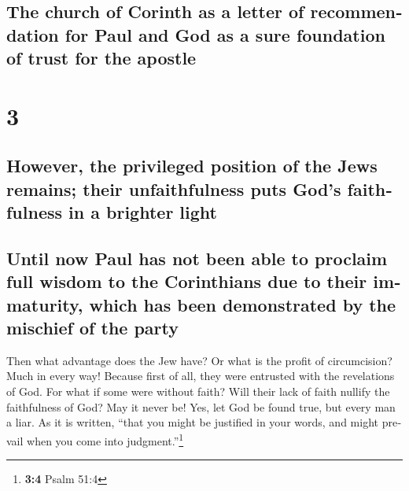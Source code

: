 \begin{paracol}{2}
\begin{otherlanguage}{english}
\hypertarget{the-church-of-corinth-as-a-letter-of-recommendation-for-paul-and-god-as-a-sure-foundation-of-trust-for-the-apostle}{%
\subsection{The church of Corinth as a letter of recommendation for Paul
and God as a sure foundation of trust for the
apostle}\label{the-church-of-corinth-as-a-letter-of-recommendation-for-paul-and-god-as-a-sure-foundation-of-trust-for-the-apostle}}

\hypertarget{section-5}{%
\section{3}\label{section-5}}

\hypertarget{however-the-privileged-position-of-the-jews-remains-their-unfaithfulness-puts-gods-faithfulness-in-a-brighter-light}{%
\subsection{However, the privileged position of the Jews remains; their
unfaithfulness puts God's faithfulness in a brighter
light}\label{however-the-privileged-position-of-the-jews-remains-their-unfaithfulness-puts-gods-faithfulness-in-a-brighter-light}}

\hypertarget{until-now-paul-has-not-been-able-to-proclaim-full-wisdom-to-the-corinthians-due-to-their-immaturity-which-has-been-demonstrated-by-the-mischief-of-the-party}{%
\subsection{Until now Paul has not been able to proclaim full wisdom to
the Corinthians due to their immaturity, which has been demonstrated by
the mischief of the
party}\label{until-now-paul-has-not-been-able-to-proclaim-full-wisdom-to-the-corinthians-due-to-their-immaturity-which-has-been-demonstrated-by-the-mischief-of-the-party}}

 Then what advantage does the Jew have? Or what is the
profit of circumcision?  Much in every way! Because first
of all, they were entrusted with the revelations of God. 
For what if some were without faith? Will their lack of faith nullify
the faithfulness of God?  May it never be! Yes, let God be
found true, but every man a liar. As it is written, ``that you might be
justified in your words, and might prevail when you come into
judgment.''\footnote{\textbf{3:4} Psalm 51:4}


\end{otherlanguage}
\end{paracol}
